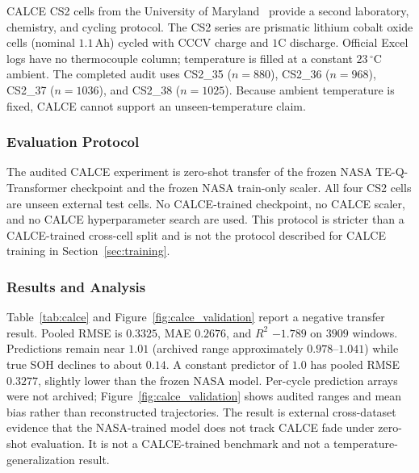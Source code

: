 \documentclass[a4paper,fleqn]{cas-sc}
\begin{document}
CALCE CS2 cells from the University of Maryland~\citep{w9rg-7173-25} provide a second laboratory, chemistry, and cycling protocol. The CS2 series are prismatic lithium cobalt oxide cells (nominal $1.1$\,Ah) cycled with CCCV charge and $1$C discharge. Official Excel logs have no thermocouple column; temperature is filled at a constant $23\,^\circ$C ambient. The completed audit uses CS2\_35 ($n=880$), CS2\_36 ($n=968$), CS2\_37 ($n=1036$), and CS2\_38 ($n=1025$). Because ambient temperature is fixed, CALCE cannot support an unseen-temperature claim.

\subsubsection{Evaluation Protocol}
\label{sec:calce_protocol}

The audited CALCE experiment is zero-shot transfer of the frozen NASA TE-Q-Transformer checkpoint and the frozen NASA train-only scaler. All four CS2 cells are unseen external test cells. No CALCE-trained checkpoint, no CALCE scaler, and no CALCE hyperparameter search are used. This protocol is stricter than a CALCE-trained cross-cell split and is not the protocol described for CALCE training in Section~\ref{sec:training}.

\subsubsection{Results and Analysis}
\label{sec:calce_results}

Table~\ref{tab:calce} and Figure~\ref{fig:calce_validation} report a negative transfer result. Pooled RMSE is $0.3325$, MAE $0.2676$, and $R^2$ $-1.789$ on $3909$ windows. Predictions remain near $1.01$ (archived range approximately $0.978$--$1.041$) while true SOH declines to about $0.14$. A constant predictor of $1.0$ has pooled RMSE $0.3277$, slightly lower than the frozen NASA model. Per-cycle prediction arrays were not archived; Figure~\ref{fig:calce_validation} shows audited ranges and mean bias rather than reconstructed trajectories. The result is external cross-dataset evidence that the NASA-trained model does not track CALCE fade under zero-shot evaluation. It is not a CALCE-trained benchmark and not a temperature-generalization result.
\end{document}
